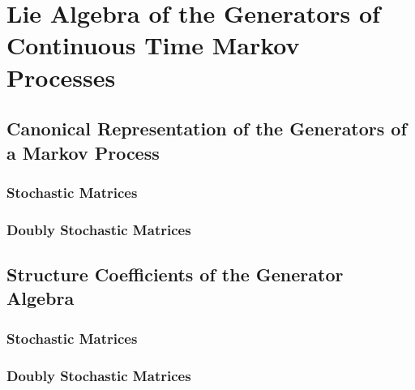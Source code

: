 \chapter{Lie Algebra of the Generators of Continuous Time Markov Processes}
\section{Canonical Representation of the Generators of a Markov Process}
\subsection{Stochastic Matrices}
\subsection{Doubly Stochastic Matrices}
\section{Structure Coefficients of the Generator Algebra}
\subsection{Stochastic Matrices}
\subsection{Doubly Stochastic Matrices}